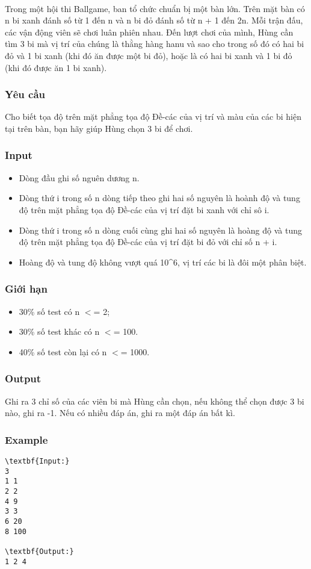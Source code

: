 

 

Trong một hội thi Ballgame, ban tổ chức chuẩn bị một bàn lớn. Trên mặt bàn có n bi xanh đánh số từ 1 đến n và n bi đỏ đánh số từ n + 1 đến 2n. Mỗi trận đấu, các vận động viên sẽ chơi luân phiên nhau. Đến lượt chơi của mình, Hùng cần tìm 3 bi mà vị trí của chúng là thằng hàng hanu và sao cho trong số đó có hai bi đỏ và 1 bi xanh (khi đó ăn được một bi đỏ), hoặc là có hai bi xanh và 1 bi đỏ (khi đó được ăn 1 bi xanh).

\subsubsection{Yêu cầu}

Cho biết tọa độ trên mặt phẳng tọa độ Đề-các của vị trí và màu của các bi hiện tại trên bàn, bạn hãy giúp Hùng chọn 3 bi để chơi.

\subsubsection{Input}
\begin{itemize}
	\item Dòng đầu ghi số nguên dương n.
	\item Dòng thứ i trong số n dòng tiếp theo ghi hai số nguyên là hoành độ và tung độ trên mặt phẳng tọa độ Đề-các của vị trí đặt bi xanh với chỉ sô i.
	\item Dòng thứ i trong số n dòng cuối cùng ghi hai số nguyên là hoàng độ và tung độ trên mặt phẳng tọa độ Đề-các của vị trí đặt bi đỏ với chỉ số n + i.
	\item Hoàng độ và tung độ không vượt quá 10\textasciicircum6, vị trí các bi là đôi một phân biệt.
\end{itemize}

\subsubsection{Giới hạn}
\begin{itemize}
	\item 30\% số test có n $<$= 2;
	\item 30\% số test khác có n $<$= 100.
	\item 40\% số test còn lại có n $<$= 1000.
\end{itemize}

\subsubsection{Output}

Ghi ra 3 chỉ số của các viên bi mà Hùng cần chọn, nếu không thể chọn được 3 bi nào, ghi ra -1. Nếu có nhiều đáp án, ghi ra một đáp án bất kì.

\subsubsection{Example}
\begin{verbatim}
\textbf{Input:}
3
1 1
2 2
4 9
3 3
6 20
8 100

\textbf{Output:}
1 2 4
\end{verbatim}